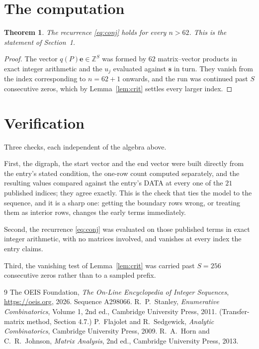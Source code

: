 \documentclass[11pt,a4paper]{article}
\theoremstyle{plain}
\newtheorem{theorem}{Theorem}
\theoremstyle{definition}
\begin{document}
\section{The computation}

\begin{theorem}
The recurrence \eqref{eq:conj} holds for every $n>62$. This is the statement of
Section~1.
\end{theorem}

\begin{proof}
The vector $q(P)\mathbf{e}\in\mathbb{Z}^{S}$ was formed by $62$ matrix--vector
products in exact integer arithmetic and the $u_j$ evaluated against $\mathbf{s}$ in turn.
They vanish from the index corresponding to $n=62+1$ onwards, and the run was continued
past $S$ consecutive zeros, which by Lemma~\ref{lem:crit} settles every larger index.
\end{proof}

\section{Verification}

Three checks, each independent of the algebra above.

First, the digraph, the start vector and the end vector were built directly from the
entry's stated condition, the one-row count computed separately, and the resulting values
compared against the entry's DATA at every one of the $21$ published indices; they
agree exactly. This is the check that ties the model to the sequence, and it is a sharp one:
getting the boundary rows wrong, or treating them as interior rows, changes the early terms
immediately.

Second, the recurrence \eqref{eq:conj} was evaluated on those published terms in exact
integer arithmetic, with no matrices involved, and vanishes at every index the entry claims.

Third, the vanishing test of Lemma~\ref{lem:crit} was carried past $S=256$ consecutive
zeros rather than to a sampled prefix.

\begin{thebibliography}{9}
 The OEIS Foundation, \emph{The On-Line Encyclopedia of Integer
Sequences}, \url{https://oeis.org}, 2026. Sequence A298066.
 R.~P.~Stanley, \emph{Enumerative Combinatorics}, Volume 1, 2nd ed.,
Cambridge University Press, 2011. (Transfer-matrix method, Section 4.7.)
 P.~Flajolet and R.~Sedgewick, \emph{Analytic Combinatorics}, Cambridge
University Press, 2009.
 R.~A.~Horn and C.~R.~Johnson, \emph{Matrix Analysis}, 2nd ed., Cambridge
University Press, 2013.
\end{thebibliography}
\end{document}
